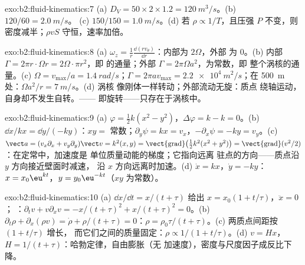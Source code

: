 \begin{solution}{exo:b2:fluid-kinematics:7}
(a) $D_V = 50 \times 2 \times 1.2 = \qty{120}{m^3/s}$。(b) $120/60 = \qty{2.0}{m/s}$。
(c) $150/150 = \qty{1.0}{m/s}$。(d) 若 $\rho \propto 1/T$，且压强 $P$ 不变，则
密度减半；$\rho vS$ 守恒，速率加倍。
\end{solution}

\begin{solution}{exo:b2:fluid-kinematics:8}
(a) $\omega_z = \frac1r\frac{\dd(rv_\theta)}{\dd r}$：内部为 $2\Omega$，外部
为 $0$。(b) 内部 $\Gamma = 2\pi r\cdot\Omega r = 2\Omega\cdot\pi r^2$，即
的通量；外部 $\Gamma = 2\pi\Omega a^2$，为常数，即
整个涡核的通量。(c) $\Omega = v_{\max}/a = \qty{1.4}{rad/s}$；$\Gamma = 2\pi av_{\max}
= \qty{2.2e4}{m^2/s}$；在 \qty{500}{m} 处：$\Omega a^2/r = \qty{7}{m/s}$。(d) 涡核
像刚体一样转动；外部流动无旋：质点
绕轴运动，自身却不发生自转。——
即旋转——只存在于涡核中。
\end{solution}

\begin{solution}{exo:b2:fluid-kinematics:9}
(a) $\varphi = \tfrac12k(x^2 - y^2)$，$\Delta\varphi = k - k = 0$。(b) $\dd x/
kx = \dd y/(-ky)$：$xy = $ 常数；$\partial_y\psi = kx = v_x$，$-\partial_x\psi =
-ky = v_y$。(c) $\vect a = (v_x\partial_x + v_y\partial_y)\vect v = k^2(x, y) =
\operatorname{\vect{grad}}\bigl(\tfrac12k^2(x^2 + y^2)\bigr) = \operatorname{\vect{grad}}
(v^2/2)$：在定常中，加速度是
单位质量动能的梯度；它指向远离
驻点的方向——质点沿 $y$ 方向接近壁面时减速，
沿 $x$ 方向远离时加速。(d) $\dot x = kx$，$\dot y = -ky$：
$x = x_0\eu^{kt}$，$y = y_0\eu^{-kt}$（$xy$ 为常数）。
\end{solution}

\begin{solution}{exo:b2:fluid-kinematics:10}
(a) $\dd x/\dd t = x/(t + \tau)$ 给出 $x = x_0(1 + t/\tau)$，$\ddot x = 0$；
：$\partial_tv + v\partial_xv = -x/(t + \tau)^2 + x/(t + \tau)^2
= 0$。(b) $\partial_t\rho + \partial_x(\rho v) = \dot\rho + \rho/(t + \tau) = 0$：$\rho =
\rho_0\tau/(t + \tau)$。(c) 两质点间距按 $(1 + t/\tau)$ 增长，
而它们之间的质量固定：$\rho \propto 1/(1 + t/\tau)$。(d) $v =
Hx$，$H = 1/(t + \tau)$：哈勃定律，自由膨胀（无
加速度），密度与尺度因子成反比下降。
\end{solution}

